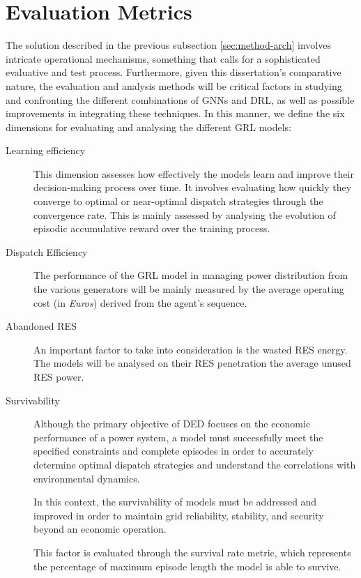 \section{Evaluation Metrics} \label{sec:method-eval}


The solution described in the previous subsection \ref{sec:method-arch} involves intricate operational mechanisms, something that calls for a sophisticated evaluative and test process. Furthermore, given this dissertation's comparative nature, the evaluation and analysis methods will be critical factors in studying and confronting the different combinations of \acp{GNN} and \ac{DRL}, as well as possible improvements in integrating these techniques. In this manner, we define the six dimensions for evaluating and analysing the different \ac{GRL} models:

\begin{description}
	\item[Learning efficiency] This dimension assesses how effectively the models learn and improve their decision-making process over time. It involves evaluating how quickly they converge to optimal or near-optimal dispatch strategies through the convergence rate. This is mainly assessed by analysing the evolution of episodic accumulative reward over the training process.
	
	\item[Dispatch Efficiency] The performance of the \ac{GRL} model in managing power distribution from the various generators will be mainly measured by the average operating cost (in \textit{Euros}) derived from the agent's sequence. 
	
	\item[Abandoned RES] An important factor to take into consideration is the wasted \ac{RES} energy. The models will be analysed on their \ac{RES} penetration the average unused \ac{RES} power.
	
	\item[Survivability] Although the primary objective of \ac{DED} focuses on the economic performance of a power system, a model must successfully meet the specified constraints and complete episodes in order to accurately determine optimal dispatch strategies and understand the correlations with environmental dynamics. \par
	In this context, the survivability of models must be addressed and improved in order to maintain grid reliability, stability, and security beyond an economic operation. \par
	This factor is evaluated through the survival rate metric, which represents the percentage of maximum episode length the model is able to survive.
	

\end{description}
